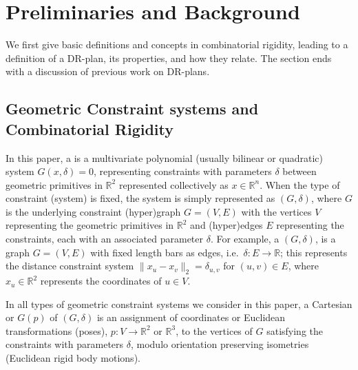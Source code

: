 \section{Preliminaries and Background}
\label{sec:prelim}


We first give basic definitions and concepts in combinatorial rigidity, leading to a definition of a DR-plan, its properties, and how they relate. The section ends with a discussion of previous work on DR-plans.

\subsection{Geometric Constraint systems and Combinatorial Rigidity}
\label{sec:prelim:defs}
\label{sec:appendix:defs}


In this paper, a  is a multivariate polynomial (usually bilinear or quadratic) system $G(x,\delta)=0$, representing constraints with parameters $\delta$ between geometric primitives  in $\mathbb{R}^2$ represented collectively as $x\in \mathbb{R}^n$.
%
When the type of constraint (system) is fixed, the system is simply represented as $(G,\delta)$, where $G$ is the underlying constraint (hyper)graph $G = (V,E)$ with the vertices $V$ representing the geometric primitives in $\mathbb{R}^2$ and (hyper)edges $E$ representing the constraints, each with an associated parameter $\delta$.
%
For example, a  $(G,\delta)$, is a graph $G=(V,E)$ with fixed length bars as edges,
i.e.\ $\delta: E \rightarrow \mathbb{R}$; this represents the distance constraint system $\| x_u -x_v \|_2 = \delta_{u,v}$ for  $(u,v) \in E$, where $x_u \in \mathbb{R}^2$ represents the coordinates of $u\in V$.



In all types of geometric constraint systems we consider in this paper, a Cartesian  or  $G(p)$ of $(G,\delta)$ is an assignment of coordinates or Euclidean transformations (poses), $p: V \rightarrow \mathbb{R}^2$ or $\mathbb{R}^3$, to the vertices of $G$ satisfying the constraints with parameters $\delta$, modulo orientation preserving isometries (Euclidean rigid body motions).

